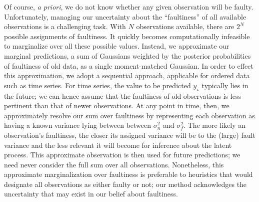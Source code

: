 \documentclass{article}
\newcommand{\deq}{\ensuremath{\triangleq}}
\newcommand{\given}{\ensuremath{\mid}}
\newcommand{\cm}[1]{\ensuremath{\mathcal{#1}}}
\newcommand{\st}{_{\star}}
\DeclareMathOperator{\fault}{fault}
\begin{document}

Of course, {\it a priori}, we do not know whether any given
observation will be faulty.  Unfortunately, managing our uncertainty
about the ``faultiness'' of all available observations is a
challenging task. With $N$ observations available, there are $2^N$
possible assignments of faultiness. It quickly becomes computationally infeasible to marginalize over all these possible values. Instead, we approximate our marginal predictions, a sum of Gaussians weighted by the posterior probabilities of faultiness of old data, as a single moment-matched Gaussian. In order to effect this approximation, we adopt a sequential approach, applicable for ordered data
such as time series. For time series, the value to be predicted $y\st$ typically lies in the future; we can hence assume that the faultiness of old observations is less pertinent than that of newer observations. At any point in time, then, we approximately resolve our sum over faultiness 
by representing
each observation as having a known variance lying between between
$\sigma_n^2$ and $\sigma_f^2$.
 The more likely an observation's
faultiness, the closer its assigned variance will be to the (large)
fault variance and the less relevant it will become for inference
about the latent process. This approximate observation is then used
for future predictions; we need never consider the full sum over all
observations. Nonetheless, this approximate marginalization over
faultiness is preferable to heuristics that would designate all
observations as either faulty or not; our method acknowledges the
uncertainty that may exist in our belief about faultiness.
\end{document}
